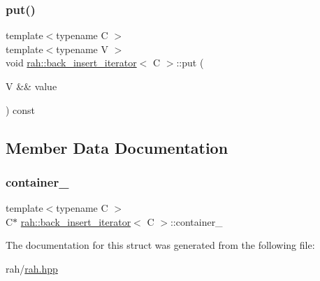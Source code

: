 \subsubsection{\texorpdfstring{put()}{put()}}
{\footnotesize\ttfamily template$<$typename C $>$ \\
template$<$typename V $>$ \\
void \mbox{\hyperlink{structrah_1_1back__insert__iterator}{rah\+::back\+\_\+insert\+\_\+iterator}}$<$ C $>$\+::put (\begin{DoxyParamCaption}\item[{V \&\&}]{value }\end{DoxyParamCaption}) const\hspace{0.3cm}{\ttfamily [inline]}}



\subsection{Member Data Documentation}
\mbox{\label{structrah_1_1back__insert__iterator_a9abb383f80748b5baba2ecd6bff83056}} 
\subsubsection{\texorpdfstring{container\_}{container\_}}
{\footnotesize\ttfamily template$<$typename C $>$ \\
C$\ast$ \mbox{\hyperlink{structrah_1_1back__insert__iterator}{rah\+::back\+\_\+insert\+\_\+iterator}}$<$ C $>$\+::container\+\_\+}



The documentation for this struct was generated from the following file\+:\begin{DoxyCompactItemize}
\item 
rah/\mbox{\hyperlink{rah_8hpp}{rah.\+hpp}}\end{DoxyCompactItemize}
